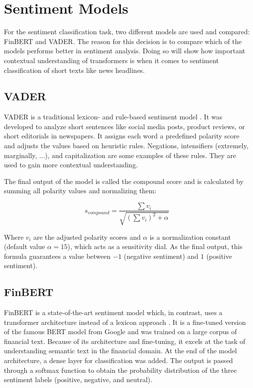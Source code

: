 \documentclass[Master,english,IEEE]{twbook}
\begin{document}

\section{Sentiment Models}
For the sentiment classification task, two different models are used and compared: FinBERT and VADER. The reason for this decision is to compare which of the models performs better in sentiment analysis. Doing so will show how important contextual understanding of transformers is when it comes to sentiment classification of short texts like news headlines.

\subsection{VADER}
VADER is a traditional lexicon- and rule-based sentiment model \cite{hutto2014vader}. It was developed to analyze short sentences like social media posts, product reviews, or short editorials in newspapers. It assigns each word a predefined polarity score and adjusts the values based on heuristic rules. Negations, intensifiers (extremely, marginally, ...), and capitalization are some examples of these rules. They are used to gain more contextual understanding.

The final output of the model is called the compound score and is calculated by summing all polarity values and normalizing them:

$$s_{compound} = \frac{\sum v_i}{\sqrt{\left(\sum v_i\right)^2 + \alpha}}$$

Where $v_i$ are the adjusted polarity scores and $\alpha$ is a normalization constant (default value $\alpha = 15$), which acts as a sensitivity dial. As the final output, this formula guarantees a value between $-1$ (negative sentiment) and $1$ (positive sentiment).

\subsection{FinBERT}
FinBERT is a state-of-the-art sentiment model which, in contrast, uses a transformer architecture instead of a lexicon approach \cite{araci2019finbert}. It is a fine-tuned version of the famous BERT model from Google \cite{devlin2019bert} and was trained on a large corpus of financial text. Because of its architecture and fine-tuning, it excels at the task of understanding semantic text in the financial domain. At the end of the model architecture, a dense layer for classification was added. The output is passed through a softmax function to obtain the probability distribution of the three sentiment labels (positive, negative, and neutral).
\end{document}
